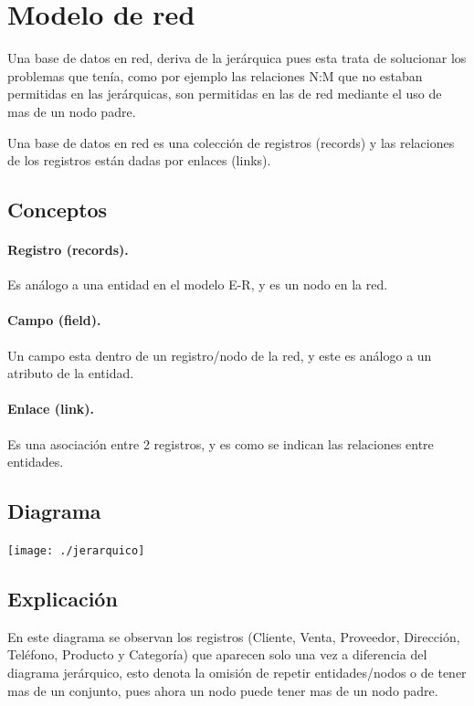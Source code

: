 \documentclass[spanish,12pt,letterpapper]{article}
\begin{document}
	\section{Modelo de red}
Una base de datos en red, deriva de la jerárquica pues esta trata de solucionar los problemas que tenía, como por ejemplo las relaciones N:M que no estaban permitidas en las jerárquicas, son permitidas en las de red mediante el uso de mas de un nodo padre.

Una base de datos en red es una colección de registros (records) y las relaciones de los registros están dadas por enlaces (links).
	
	\subsection{Conceptos}
	\paragraph{Registro (records).} Es análogo a una entidad en el modelo E-R, y es un nodo en la red.\\
	
	\paragraph{Campo (field).} Un campo esta dentro de un registro/nodo de la red, y este es análogo a un atributo de la entidad.\\
	
	\paragraph{Enlace (link).} Es una asociación entre 2 registros, y es como se indican las relaciones entre entidades.
	
	\subsection{Diagrama}
	
	\begin{center}
	\texttt{[image: ./jerarquico]}~\\[1cm]
	\end{center}
	
	\subsection{Explicación}
	En este diagrama se observan los registros (Cliente, Venta, Proveedor, Dirección, Teléfono, Producto y Categoría) que aparecen solo una vez a diferencia del diagrama jerárquico, esto denota la omisión de repetir entidades/nodos o de tener mas de un conjunto, pues ahora un nodo puede tener mas de un nodo padre.\\
	
\end{document}
